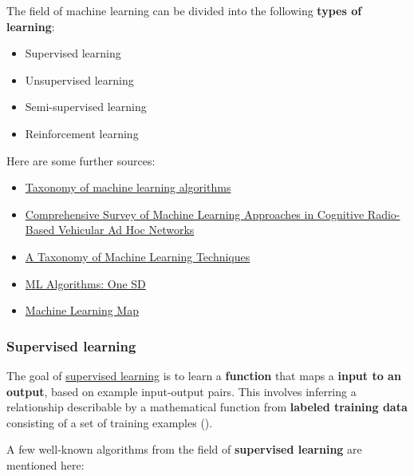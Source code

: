\documentclass [oneside,10pt,a4paper,ngerman,BCOR10mm,headsepline,parindent,final]{scrartcl}
\providecommand{\tightlist}{%
      \setlength{\itemsep}{0pt}\setlength{\parskip}{0pt}}
\begin{document}
The field of machine learning can be divided into the following
\textbf{types of learning}:

\begin{itemize}
\tightlist
\item
  Supervised learning
\item
  Unsupervised learning
\item
  Semi-supervised learning
\item
  Reinforcement learning
\end{itemize}

Here are some further sources:

\begin{itemize}
\tightlist
\item
  \href{https://subscription.packtpub.com/book/big-data-/9781783558742/1/ch01lvl1sec12/taxonomy-of-machine-learning-algorithms}{Taxonomy
  of machine learning algorithms}
\item
  \href{https://www.researchgate.net/publication/340878018_Comprehensive_Survey_of_Machine_Learning_Approaches_in_Cognitive_Radio-Based_Vehicular_Ad_Hoc_Networks}{Comprehensive
  Survey of Machine Learning Approaches in Cognitive Radio-Based
  Vehicular Ad Hoc Networks}
\item
  \href{https://www.researchgate.net/publication/358089496_A_Taxonomy_of_Machine_Learning_Techniques}{A
  Taxonomy of Machine Learning Techniques}
\item
  \href{https://medium.com/@Shaier/ml-algorithms-one-sd-\%CF\%83-74bcb28fafb6}{ML
  Algorithms: One SD}
\item
  \href{https://github.com/trekhleb/homemade-machine-learning\#machine-learning-map}{Machine
  Learning Map}
\end{itemize}

    \hypertarget{supervised-learning}{%
\subsubsection{Supervised learning}\label{supervised-learning}}

The goal of
\href{https://en.wikipedia.org/wiki/Supervised_learning}{supervised
learning} is to learn a \textbf{function} that maps a \textbf{input to
an output}, based on example input-output pairs. This involves inferring
a relationship describable by a mathematical function from
\textbf{labeled training data} consisting of a set of training examples
(\cite{Wiki_Supervised_learning}).

A few well-known algorithms from the field of \textbf{supervised
learning} are mentioned here:
\end{document}
